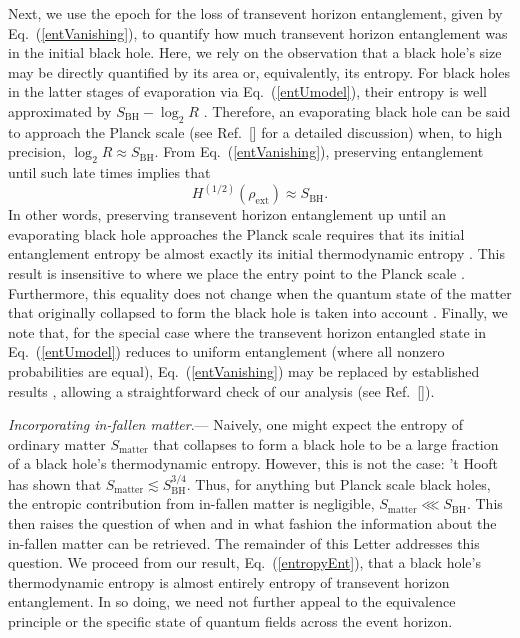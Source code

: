 \documentclass[aps,showpacs,prl,12pt]{revtex4}
\begin{document}
Next, we use the epoch for the loss of transevent horizon entanglement,
given by Eq.~(\ref{entVanishing}), to quantify how much transevent
horizon entanglement was in the initial black hole. Here, we rely on the
observation that a black hole's size may be directly quantified by its 
area or, equivalently, its entropy. 
For black holes in the latter stages of evaporation via
Eq.~(\ref{entUmodel}), their entropy is well approximated by
$S_{\text{BH}} - \log_2 R$ \cite{SM}. Therefore, an evaporating
black hole can be said to approach the Planck scale (see
Ref.~[] for a detailed discussion) when, to high
precision, $\log_2 R\approx S_{\text{BH}}$. From Eq.~(\ref{entVanishing}),
preserving entanglement until such late times implies that
\begin{equation}
H^{(1/2)}(\rho_{\text{ext}})\approx S_{\text{BH}}.
\label{entropyEnt}
\end{equation}
In other words, preserving transevent horizon entanglement up until
an evaporating black hole approaches the Planck scale requires that
its initial entanglement entropy be almost exactly its initial thermodynamic
entropy \cite{fnA}. This result is insensitive to where we place the
entry point to the Planck scale \cite{SM}. Furthermore, this equality
does not change when the quantum state of the matter that originally
collapsed to form the black hole is taken into account \cite{SM}.
Finally, we note that, for the special case where the transevent
horizon entangled state in Eq.~(\ref{entUmodel}) reduces to uniform
entanglement (where all nonzero probabilities are equal), 
Eq.~(\ref{entVanishing}) may be replaced by established results 
\cite{Hayden07}, allowing a straightforward check of our analysis
(see Ref.~[]).

{\it Incorporating in-fallen matter}.---%
Naively, one might expect the entropy of ordinary matter 
$S_{\text{matter}}$ that collapses to form a black hole to be a large 
fraction of a black hole's thermodynamic entropy. However, this is not 
the case: 't Hooft \cite{tHooft93} has shown that 
$S_{\text{matter}}\lesssim S_{\text{BH}}^{3/4}$. Thus, for anything but 
Planck scale black holes, the entropic contribution from in-fallen matter 
is negligible, $S_{\text{matter}}\lll S_{\text{BH}}$. This then raises
the question of when and in what fashion the information about the
in-fallen matter can be retrieved. The remainder of this Letter addresses
this question. We proceed from our result, Eq.~(\ref{entropyEnt}),
that a black hole's thermodynamic entropy is almost entirely entropy
of transevent horizon entanglement. In so doing, we need not further
appeal to the equivalence principle or the specific state of quantum
fields across the event horizon. 
\end{document}
